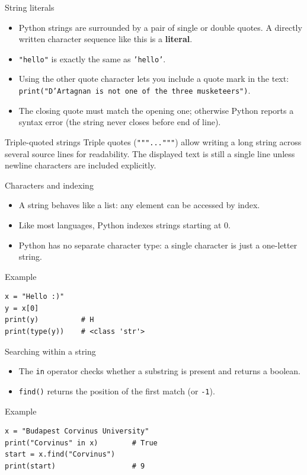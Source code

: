 \documentclass[aspectratio=169,11pt]{beamer}
\begin{document}
\begin{frame}[fragile]{String literals}
  \begin{itemize}
    \item Python strings are surrounded by a pair of single or double quotes.
          A directly written character sequence like this is a \textbf{literal}.
    \item \texttt{"hello"} is exactly the same as \texttt{'hello'}.
    \item Using the other quote character lets you include a quote mark in the
          text: \texttt{print("D'Artagnan is not one of the three musketeers")}.
    \item The closing quote must match the opening one; otherwise Python
          reports a syntax error (the string never closes before end of line).
  \end{itemize}
  \begin{block}{Triple-quoted strings}
    Triple quotes (\texttt{"""..."""}) allow writing a long string across
    several source lines for readability. The displayed text is still a single
    line unless newline characters are included explicitly.
  \end{block}
\end{frame}

\begin{frame}[fragile]{Characters and indexing}
  \begin{itemize}
    \item A string behaves like a list: any element can be accessed by index.
    \item Like most languages, Python indexes strings starting at 0.
    \item Python has no separate character type: a single character is just a
          one-letter string.
  \end{itemize}
  \begin{block}{Example}
\begin{verbatim}
x = "Hello :)"
y = x[0]
print(y)          # H
print(type(y))    # <class 'str'>
\end{verbatim}
  \end{block}
\end{frame}

\begin{frame}[fragile]{Searching within a string}
  \begin{itemize}
    \item The \texttt{in} operator checks whether a substring is present and
          returns a boolean.
    \item \texttt{find()} returns the position of the first match (or \texttt{-1}).
  \end{itemize}
  \begin{block}{Example}
\begin{verbatim}
x = "Budapest Corvinus University"
print("Corvinus" in x)        # True
start = x.find("Corvinus")
print(start)                  # 9
\end{verbatim}
  \end{block}
\end{frame}
\end{document}
